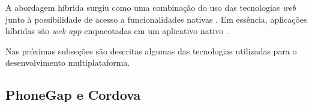 A abordagem híbrida surgiu como uma combinação do uso das tecnologias \textit{web} junto à possibilidade de acesso a funcionalidades nativas \cite{heitkotter_evaluating_2013}.
Em essência, aplicações híbridas são \textit{web app} empacotadas em um aplicativo nativo \cite{stark_building_2010}.

\begin{comment}


Dentro da Engenharia de \textit{Software}, existe uma corrente que defende a criação de \textit{software} como uma Linha de Produtos (\textit{SPL}). 
No contexto de desenvolvimento, linha de produtos significa a criação de vários sistemas de \textit{software} a partir de um cojunto semelhante de requisitos,
cada novo sistema possui um conjunto distinto de requisitos que os diferencia dos demais, no entanto, todos os sistemas devem possui uma mesma linha de mercado
como educação ou aviação, por exemplo.

Linha de Produto de Software é um conjunto de sistemas de software que compartilham
um conjunto comum e gerenciado de características satisfazendo as necessidades específicas
de um segmento de mercado ou missão particular e que são desenvolvidos a partir de um
conjunto comum de artefatos de uma forma prescrita

um conjunto de aplicações
similares de um domínio, que podem ser desenvolvidas a partir de uma arquitetura genérica
comum, a arquitetura da LPS, e um conjunto de componentes que povoam a arquitetura

Com isso, a finalidade de uma linha de produto de software é diminuir os esforços de
engenharia necessários para construir aplicativos customizáveis e extensíveis de forma sis-
temática, a partir de artefatos gerenciáveis e reutilizáveis, aproveitando a semelhança entre
os sistemas e a capacidade de gestão de variações existentes entre os mesmos

...É possível fazer uma correlação com o desenvolvimento de aplicativos multiplataforma...
    
\end{comment} 

Nas próximas subseções são descritas algumas das tecnologias utilizadas para o desenvolvimento multiplataforma.

\subsection{PhoneGap e Cordova} \label{subsection:phonegap}

